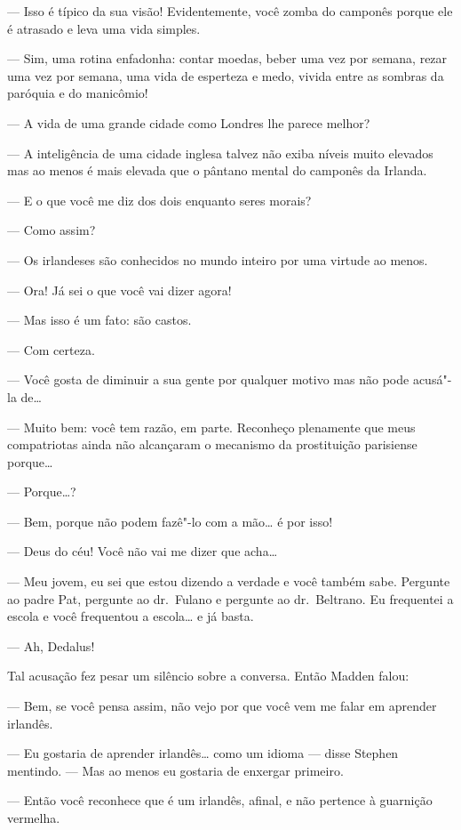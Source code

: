 --- Isso é típico da sua visão!  Evidentemente, você zomba do
camponês porque ele é atrasado e leva uma vida simples.

--- Sim, uma rotina enfadonha: contar moedas, beber uma vez por
semana, rezar uma vez por semana, uma vida de esperteza e medo, vivida
entre as sombras da paróquia e do manicômio!

--- A vida de uma grande cidade como Londres lhe parece melhor?

--- A inteligência de uma cidade inglesa talvez não
exiba níveis muito elevados mas ao menos é mais elevada que o pântano
mental do camponês da Irlanda.

--- E o que você me diz dos dois enquanto seres morais?

--- Como assim?

--- Os irlandeses são conhecidos no mundo inteiro por uma virtude
ao menos.

--- Ora!  Já sei o que você vai dizer agora!

--- Mas isso é um fato: são castos.

--- Com certeza.

--- Você gosta de diminuir a sua gente por qualquer motivo mas
não pode acusá"-la de\ldots{}

--- Muito bem: você tem razão, em parte.  Reconheço plenamente
que meus compatriotas ainda não alcançaram o mecanismo da prostituição
parisiense porque\ldots{}

--- Porque\ldots{}?

--- Bem, porque não podem fazê"-lo com a mão\ldots{} é por isso!

--- Deus do céu!  Você não vai me dizer que acha\ldots{}

--- Meu jovem, eu sei que estou dizendo a verdade e você também
sabe.  Pergunte ao padre Pat, pergunte ao dr.~Fulano e pergunte ao dr.~Beltrano.  
Eu frequentei a escola e você frequentou a escola\ldots{} e já
basta.

--- Ah, Dedalus!

Tal acusação fez pesar um silêncio sobre a conversa.  Então Madden
falou:

--- Bem, se você pensa assim, não vejo por que você vem me
falar em aprender irlandês.

--- Eu gostaria de aprender irlandês\ldots{} como um idioma --- disse
Stephen mentindo.  --- Mas ao menos eu gostaria de enxergar primeiro.

--- Então você reconhece que é um irlandês, afinal, e não
pertence à guarnição vermelha.

